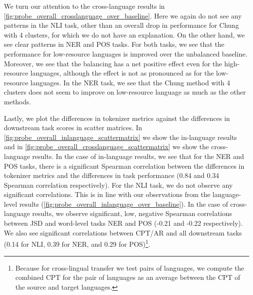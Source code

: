 We turn our attention to the cross-language results in \autoref{fig:probe_overall_crosslanguage_over_baseline}. Here we again do not see any patterns in the NLI task, other than an overall drop in performance for Chung with 4 clusters, for which we do not have an explanation. On the other hand, we see clear patterns in NER and POS tasks. For both tasks, we see that the performance for low-resource languages is improved over the unbalanced baseline. Moreover, we see that the balancing has a net positive effect even for the high-resource languages, although the effect is not as pronounced as for the low-resource languages. In the NER task, we see that the Chung method with 4 clusters does not seem to improve on low-resource language as much as the other methods. 

Lastly, we plot the differences in tokenizer metrics against the differences in downstream task scores in scatter matrices. In \autoref{fig:probe_overall_inlanguage_scattermatrix} we show the in-language results and in \autoref{fig:probe_overall_crosslanguage_scattermatrix} we show the cross-language results. In the case of in-language results, we see that for the NER and POS tasks, there is a significant Spearman correlation between the differences in tokenizer metrics and the differences in task performance (0.84 and 0.34 Spearman correlation respectively). For the NLI task, we do not observe any significant correlations. This is in line with our observations from the language-level results (\autoref{fig:probe_overall_inlanguage_over_baseline}). In the case of cross-language results, we observe significant, low, negative Spearman correlations between JSD and word-level tasks NER and POS (-0.21 and -0.22 respectively). We also see significant correlations between CPT/AR and all downstream tasks (0.14 for NLI, 0.39 for NER, and 0.29 for POS)\footnote{Because for cross-lingual transfer we test pairs of languages, we compute the combined CPT for the pair of languages as an average between the CPT of the source and target languages.}.

